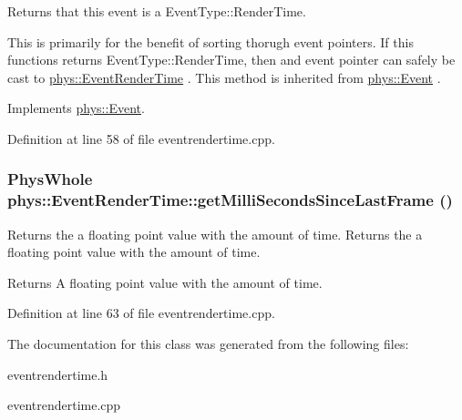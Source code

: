 Returns that this event is a EventType::RenderTime. 

This is primarily for the benefit of sorting thorugh event pointers. If this functions returns EventType::RenderTime, then and event pointer can safely be cast to \hyperlink{classphys_1_1EventRenderTime}{phys::EventRenderTime} . This method is inherited from \hyperlink{classphys_1_1Event}{phys::Event} . 

Implements \hyperlink{classphys_1_1Event_ac2c0623a6bc399e62f4b9fb2c022ea73}{phys::Event}.



Definition at line 58 of file eventrendertime.cpp.

\hypertarget{classphys_1_1EventRenderTime_a1aa4e9d58140b2d1d4c52fdb0f74662f}{
\subsubsection[{getMilliSecondsSinceLastFrame}]{\setlength{\rightskip}{0pt plus 5cm}PhysWhole phys::EventRenderTime::getMilliSecondsSinceLastFrame ()}}
\label{d3/d8b/classphys_1_1EventRenderTime_a1aa4e9d58140b2d1d4c52fdb0f74662f}


Returns the a floating point value with the amount of time.  Returns the a floating point value with the amount of time. 

\begin{DoxyReturn}{Returns}
A floating point value with the amount of time. 
\end{DoxyReturn}


Definition at line 63 of file eventrendertime.cpp.



The documentation for this class was generated from the following files:\begin{DoxyCompactItemize}
\item 
eventrendertime.h\item 
eventrendertime.cpp\end{DoxyCompactItemize}

